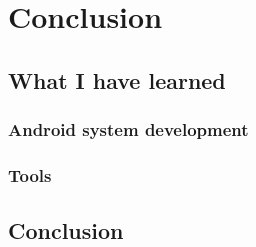 \chapter{Conclusion}

\section{What I have learned}
\subsection{Android system development}
\subsection{Tools}


\section{Conclusion}
